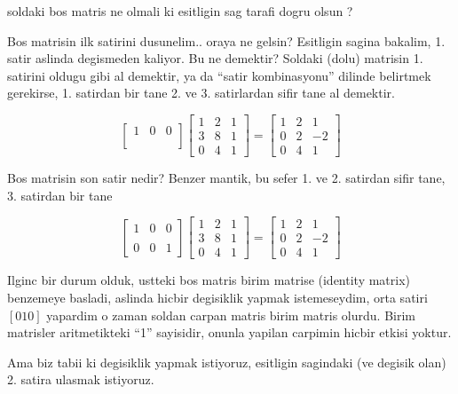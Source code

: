 \documentclass[12pt,fleqn]{article}\usepackage{../common}
\begin{document}
soldaki bos matris ne olmali ki esitligin sag tarafi dogru olsun ?

Bos matrisin ilk satirini dusunelim.. oraya ne gelsin? Esitligin sagina
bakalim, 1. satir aslinda degismeden kaliyor. Bu ne demektir? Soldaki
(dolu) matrisin 1. satirini oldugu gibi al demektir, ya da ``satir
kombinasyonu'' dilinde belirtmek gerekirse, 1. satirdan bir tane 2. ve
3. satirlardan sifir tane al demektir. 

$$ 
\left[\begin{array}{rrr}
1 & 0 & 0 \\
 &  &  \\
 &  & 
\end{array}\right]
\left[\begin{array}{rrr}
1 & 2 & 1 \\
3 & 8 & 1 \\
0 & 4 & 1
\end{array}\right] =
\left[\begin{array}{rrr}
    1 & 2 & 1 \\
    0 & 2 & -2 \\
    0 & 4 & 1
  \end{array}\right]
 $$

Bos matrisin son satir nedir? Benzer mantik, bu sefer 1. ve 2. satirdan
sifir tane, 3. satirdan bir tane


$$ 
\left[\begin{array}{rrr}
1 & 0 & 0 \\
 &  &  \\
0 & 0 & 1
\end{array}\right]
\left[\begin{array}{rrr}
1 & 2 & 1 \\
3 & 8 & 1 \\
0 & 4 & 1
\end{array}\right] =
\left[\begin{array}{rrr}
    1 & 2 & 1 \\
    0 & 2 & -2 \\
    0 & 4 & 1
  \end{array}\right]
 $$

Ilginc bir durum olduk, ustteki bos matris birim matrise (identity matrix)
benzemeye basladi, aslinda hicbir degisiklik yapmak istemeseydim, orta
satiri $[0 1 0]$ yapardim o zaman soldan carpan matris birim matris
olurdu. Birim matrisler aritmetikteki ``1'' sayisidir, onunla yapilan
carpimin hicbir etkisi yoktur. 

Ama biz tabii ki degisiklik yapmak istiyoruz, esitligin sagindaki (ve
degisik olan) 2. satira ulasmak istiyoruz. 
\end{document}
